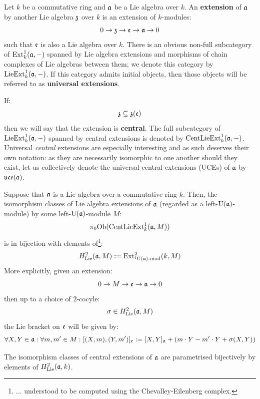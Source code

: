         \begin{definition}
            Let $k$ be a commutative ring and $\mathfrak{a}$ be a Lie algebra over $k$. An \textbf{extension} of $\mathfrak{a}$ by another Lie algebra $\mathfrak{z}$ over $k$ is an extension of $k$-modules:
                $$0 \to \mathfrak{z} \to \mathfrak{e} \to \mathfrak{a} \to 0$$
            such that $\mathfrak{e}$ is also a Lie algebra over $k$. There is an obvious non-full subcategory of $\mathrm{Ext}^1_k(\mathfrak{a}, -)$ spanned by Lie algebra extensions and morphisms of chain complexes of Lie algebras between them; we denote this category by $\mathrm{Lie}\mathrm{Ext}^1_k(\mathfrak{a}, -)$. If this category admits initial objects, then those objects will be referred to as \textbf{universal extensions}.
            
            If:
                $$\mathfrak{z} \subseteq \mathfrak{z}(\mathfrak{e})$$
            then we will say that the extension is \textbf{central}. The full subcategory of $\mathrm{Lie}\mathrm{Ext}^1_k(\mathfrak{a}, -)$ spanned by central extensions is denoted by $\mathrm{Cent}\mathrm{Lie}\mathrm{Ext}^1_k(\mathfrak{a}, -)$. Universal \textit{central} extensions are especially interesting and as such deserves their own notation: as they are necessarily isomorphic to one another should they exist, let us collectively denote the universal central extensions (UCEs) of $\mathfrak{a}$ by $\mathfrak{uce}(\mathfrak{a})$.
        \end{definition}
        \begin{proposition}[$H^2_{\Lie}$ = extensions]
            \cite[Theorem VIII.3.3]{hilton_stammbach_homological_algebra} Suppose that $\mathfrak{a}$ is a Lie algebra over a commutative ring $k$. Then, the isomorphism classes of Lie algebra extensions of $\mathfrak{a}$ (regarded as a left-$\mathrm{U}(\mathfrak{a})$-module) by some left-$\mathrm{U}(\mathfrak{a})$-module $M$:
                $$\pi_0\mathrm{Ob}( \mathrm{Cent}\mathrm{Lie}\mathrm{Ext}^1_k(\mathfrak{a}, M) )$$
            is in bijection with elements of\footnote{... understood to be computed using the Chevalley-Eilenberg complex.}:
                $$H^2_{\mathrm{Lie}}(\mathfrak{a}, M) := \mathrm{Ext}^2_{{}^l\mathrm{U}(\mathfrak{a})\text{-}\mathrm{mod}}(k, M)$$
            More explicitly, given an extension:
                $$0 \to M \to \mathfrak{e} \to \mathfrak{a} \to 0$$
            then up to a choice of $2$-cocyle:
                $$\sigma \in H^2_{\mathrm{Lie}}(\mathfrak{a}, M)$$
            the Lie bracket on $\mathfrak{e}$ will be given by:
                $$\forall X, Y \in \mathfrak{a}: \forall m, m' \in M: [ (X, m), (Y, m') ]_{\mathfrak{e}} := [X, Y]_{\mathfrak{a}} + ( m \cdot Y - m' \cdot Y + \sigma(X, Y) )$$
        \end{proposition}
        \begin{corollary}[Trivial cohomological coefficients = central extensions]
            The isomorphism classes of central extensions of $\mathfrak{a}$ are parametrised bijectively by elements of $H^2_{\mathrm{Lie}}(\mathfrak{a}, k)$.
        \end{corollary}
